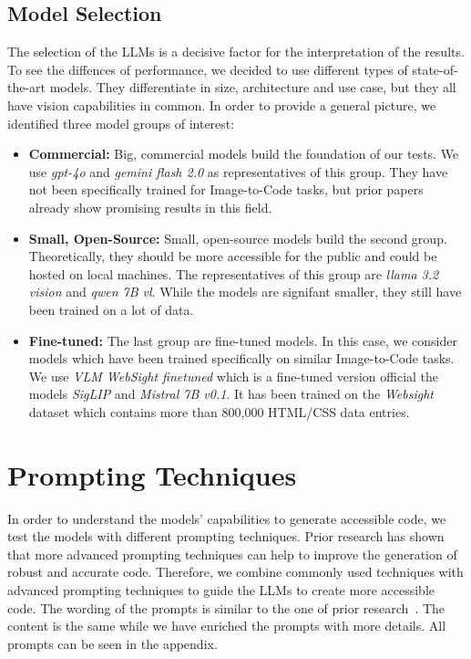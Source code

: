 \subsection{Model Selection}
The selection of the LLMs is a decisive factor for the interpretation of the results.
To see the diffences of performance, we decided to use different types of 
state-of-the-art models. They differentiate in size, architecture and use case, but 
they all have vision capabilities in common.
In order to provide a general picture, we identified three model groups of interest:
\begin{itemize}
  \item \textbf{Commercial:} Big, commercial models build the foundation of our tests.
    We use \textit{gpt-4o} and \textit{gemini flash 2.0} as representatives of this group.
    They have not been specifically trained for Image-to-Code tasks, but prior papers 
    already show promising results in this field.
  \item \textbf{Small, Open-Source:} Small, open-source models build the second group. 
    Theoretically, they should be more accessible for the public and could be hosted 
    on local machines. The representatives of this group are \textit{llama 3.2 vision}
    and \textit{qwen 7B vl}. While the models are signifant smaller, they still have been 
    trained on a lot of data.
  \item \textbf{Fine-tuned:} The last group are fine-tuned models. In this case, we 
    consider models which have been trained specifically on similar Image-to-Code 
    tasks. We use \textit{VLM WebSight finetuned} which is a fine-tuned version official
    the models \textit{SigLIP} and \textit{Mistral 7B v0.1}. It has been trained on the 
    \textit{Websight} dataset which contains more than 800,000 HTML/CSS data entries. 
\end{itemize}

\section{Prompting Techniques}
In order to understand the models' capabilities to generate accessible code, we test
the models with different prompting techniques. Prior research has shown that more 
advanced prompting techniques can help to improve the generation of robust and 
accurate code. Therefore, we combine commonly used techniques with 
advanced prompting techniques to guide the LLMs to create more accessible code.
The wording of the prompts is similar to the one of prior research~\parencite{suh2025accessiblecode, xiao2024interaction2code}.
The content is the same while we have enriched the prompts with more details.\newline
All prompts can be seen in the appendix.

